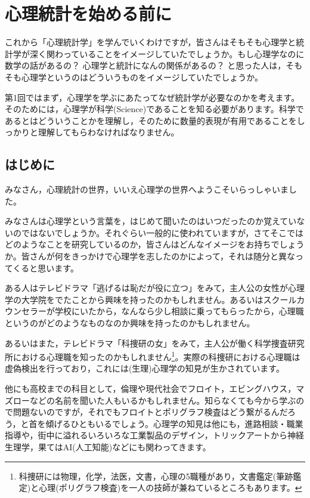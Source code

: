 \documentclass{ltjsbook}
\begin{document}
\chapter{心理統計を始める前に}
\label{ch01_introduction}
これから「心理統計学」を学んでいくわけですが，皆さんはそもそも心理学と統計学が深く関わっていることをイメージしていたでしょうか。もし心理学なのに数学の話があるの？ 心理学と統計になんの関係があるの？ と思った人は，そもそも心理学というのはどういうものをイメージしていたでしょうか。

第1回ではまず，心理学を学ぶにあたってなぜ統計学が必要なのかを考えます。そのためには，心理学が科学(Science)であることを知る必要があります。科学であるとはどういうことかを理解し，そのために数量的表現が有用であることをしっかりと理解してもらわなければなりません。

\section{はじめに}

みなさん，心理統計の世界，いいえ心理学の世界へようこそいらっしゃいました。

みなさんは心理学という言葉を，はじめて聞いたのはいつだったのか覚えていないのではないでしょうか。それぐらい一般的に使われていますが，さてそこではどのようなことを研究しているのか，皆さんはどんなイメージをお持ちでしょうか。皆さんが何をきっかけで心理学を志したのかによって，それは随分と異なってくると思います。

ある人はテレビドラマ「逃げるは恥だが役に立つ」をみて，主人公の女性が心理学の大学院をでたことから興味を持ったのかもしれません。あるいはスクールカウンセラーが学校にいたから，なんなら少し相談に乗ってもらったから，心理職というのがどのようなものなのか興味を持ったのかもしれません。

あるいはまた，テレビドラマ「科捜研の女」をみて，主人公が働く科学捜査研究所における心理職を知ったのかもしれません\footnote{科捜研には物理，化学，法医，文書，心理の5職種があり，文書鑑定(筆跡鑑定)と心理(ポリグラフ検査)を一人の技師が兼ねているところもあります。}。実際の科捜研における心理職は虚偽検出を行っており，これには(生理)心理学の知見が生かされています。

他にも高校までの科目として，倫理や現代社会でフロイト，エビングハウス，マズローなどの名前を聞いた人もいるかもしれません。知らなくても今から学ぶので問題ないのですが，それでもフロイトとポリグラフ検査はどう繋がるんだろう，と首を傾げるひともいるでしょう。心理学の知見は他にも，進路相談・職業指導や，街中に溢れるいろいろな工業製品のデザイン，トリックアートから神経生理学，果てはAI(人工知能)などにも関わってきます。
\end{document}
